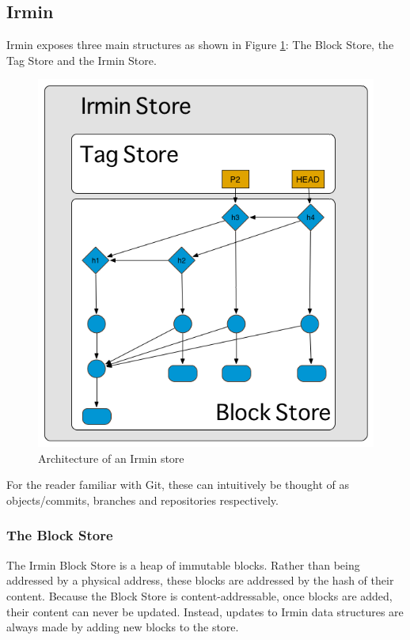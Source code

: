 \documentclass[12pt,a4paper,twoside,openright]{report}
\begin{document}
	\subsection{Irmin}
	Irmin exposes three main structures as shown in Figure \ref{fig:IrminBlockStore}: The Block Store, the Tag Store and the Irmin Store.
	\begin{figure}
		\begin{center}
		\includegraphics[width=13cm]{figs/irmin-stores.png}
		\caption{Architecture of an Irmin store}
		\label{fig:IrminBlockStore}
		\end{center}
	\end{figure}
	For the reader familiar with Git, these can intuitively be thought of as objects/commits, branches and repositories respectively.
	\subsubsection*{The Block Store}
	The Irmin Block Store is a heap of immutable blocks. 
	Rather than being addressed by a physical address, these blocks are addressed by the hash of their content.
	Because the Block Store is content-addressable, once blocks are added, their content can never be updated.
	Instead, updates to Irmin data structures are always made by adding new blocks to the store.
\end{document}
